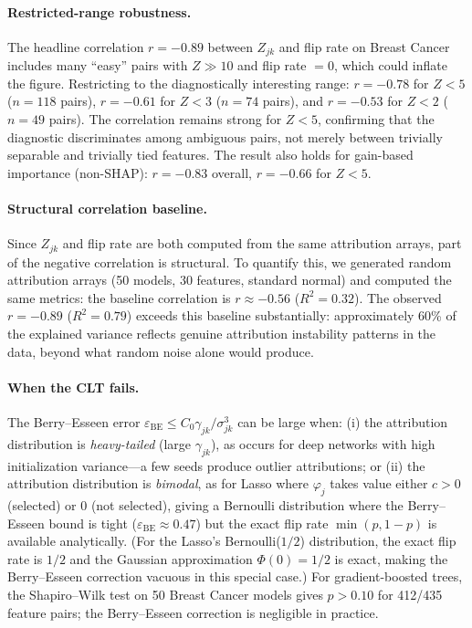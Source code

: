 \documentclass{jmlr}
\begin{document}
\paragraph{Restricted-range robustness.}
The headline correlation $r = -0.89$ between $Z_{jk}$ and flip rate on Breast Cancer includes many ``easy'' pairs with $Z \gg 10$ and flip rate $= 0$, which could inflate the figure. Restricting to the diagnostically interesting range: $r = -0.78$ for $Z < 5$ ($n = 118$ pairs), $r = -0.61$ for $Z < 3$ ($n = 74$ pairs), and $r = -0.53$ for $Z < 2$ ($n = 49$ pairs). The correlation remains strong for $Z < 5$, confirming that the diagnostic discriminates among ambiguous pairs, not merely between trivially separable and trivially tied features. The result also holds for gain-based importance (non-SHAP): $r = -0.83$ overall, $r = -0.66$ for $Z < 5$.

\paragraph{Structural correlation baseline.}
Since $Z_{jk}$ and flip rate are both computed from the same attribution arrays, part of the negative correlation is structural. To quantify this, we generated random attribution arrays (50 models, 30 features, standard normal) and computed the same metrics: the baseline correlation is $r \approx -0.56$ ($R^2 = 0.32$). The observed $r = -0.89$ ($R^2 = 0.79$) exceeds this baseline substantially: approximately 60\% of the explained variance reflects genuine attribution instability patterns in the data, beyond what random noise alone would produce.

\paragraph{When the CLT fails.}
The Berry--Esseen error $\varepsilon_{\text{BE}} \leq C_0 \gamma_{jk}/\sigma_{jk}^3$ can be large when: (i) the attribution distribution is \emph{heavy-tailed} (large $\gamma_{jk}$), as occurs for deep networks with high initialization variance---a few seeds produce outlier attributions; or (ii) the attribution distribution is \emph{bimodal}, as for Lasso where $\varphi_j$ takes value either $c > 0$ (selected) or $0$ (not selected), giving a Bernoulli distribution where the Berry--Esseen bound is tight ($\varepsilon_{\text{BE}} \approx 0.47$) but the exact flip rate $\min(p, 1-p)$ is available analytically. (For the Lasso's Bernoulli($1/2$) distribution, the exact flip rate is $1/2$ and the Gaussian approximation $\Phi(0) = 1/2$ is exact, making the Berry--Esseen correction vacuous in this special case.) For gradient-boosted trees, the Shapiro--Wilk test on 50 Breast Cancer models gives $p > 0.10$ for 412/435 feature pairs; the Berry--Esseen correction is negligible in practice.
\end{document}
